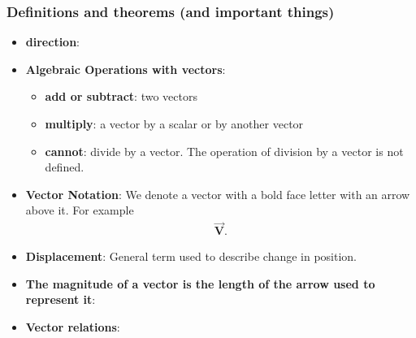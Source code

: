 \documentclass{report}
\begin{document}
    \subsubsection{Definitions and theorems (and important things)}
    \begin{itemize}
        \item \textbf{direction}:
        \item \textbf{Algebraic Operations with vectors}:
            \begin{itemize}
                \item \textbf{add or subtract}: two vectors
                \item \textbf{multiply}: a vector by a scalar or by another vector
                \item \textbf{cannot}: divide by a vector. The operation of division by a vector is not defined.
            \end{itemize}
        \item \textbf{Vector Notation}: We denote a vector with a bold face letter with an arrow above it. For example
            \begin{align*}
                \vec{\textbf{V}}
            .\end{align*}
        \item \textbf{Displacement}: General term used to describe change in position.
        \item \textbf{The magnitude of a vector is the length of the arrow used to represent it}:

        \item \textbf{Vector relations}:


\end{itemize}
\end{document}
